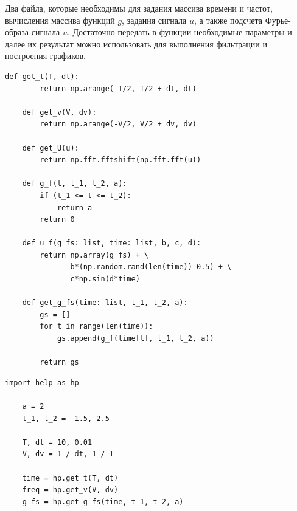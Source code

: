 \documentclass[a4paper, 12pt]{article}
\begin{document}
    
    Два файла, которые необходимы для задания массива времени и частот, вычисления массива функций $g$, задания
    сигнала $u$, а также подсчета Фурье-образа сигнала $u$. Достаточно передать в функции необходимые параметры и
    далее их результат можно использовать для выполнения фильтрации и построения графиков.
    \begin{lstlisting}[label=l1, caption={Файл help.py. Вспомогательные функции}]
    def get_t(T, dt):
        return np.arange(-T/2, T/2 + dt, dt)   
        
    def get_v(V, dv):
        return np.arange(-V/2, V/2 + dv, dv)
          
    def get_U(u):
        return np.fft.fftshift(np.fft.fft(u))
        
    def g_f(t, t_1, t_2, a):
        if (t_1 <= t <= t_2):
            return a
        return 0
        
    def u_f(g_fs: list, time: list, b, c, d):
        return np.array(g_fs) + \
               b*(np.random.rand(len(time))-0.5) + \
               c*np.sin(d*time)
        
    def get_g_fs(time: list, t_1, t_2, a):
        gs = []
        for t in range(len(time)):
            gs.append(g_f(time[t], t_1, t_2, a))
        
        return gs   
    \end{lstlisting}
    \begin{lstlisting}[label=l2, caption={Файл static.py. Вспомогательные переменные}]
    import help as hp

    a = 2
    t_1, t_2 = -1.5, 2.5

    T, dt = 10, 0.01
    V, dv = 1 / dt, 1 / T

    time = hp.get_t(T, dt)
    freq = hp.get_v(V, dv)
    g_fs = hp.get_g_fs(time, t_1, t_2, a)
    \end{lstlisting}
\end{document}
